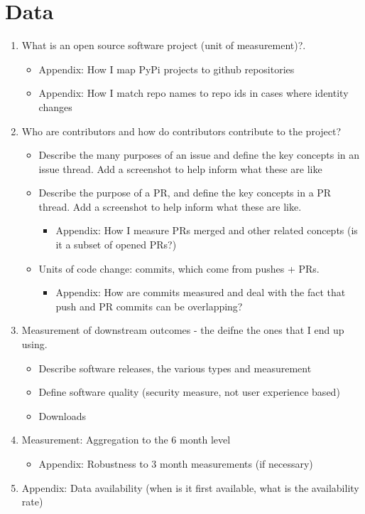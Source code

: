 \documentclass[12pt,notitlepage]{article}
\begin{document}
\section{Data} \label{sec:data}
\begin{enumerate}
    \item What is an open source software project (unit of measurement)?.
    \begin{itemize}
        \item Appendix: How I map PyPi projects to github repositories
        \item Appendix: How I match repo names to repo ids in cases where identity changes
    \end{itemize}
    \item Who are contributors and how do contributors contribute to the project?
    
    \begin{itemize}
        \item Describe the many purposes of an issue and define the key concepts in an issue thread. Add a screenshot to help inform what these are like
        \item Describe the purpose of a PR, and define the key concepts in a PR thread. Add a screenshot to help inform what these are like. 
        \begin{itemize}
            \item Appendix: How I measure PRs merged and other related concepts (is it a subset of opened PRs?)
        \end{itemize}
        \item Units of code change: commits, which come from pushes + PRs. 
        \begin{itemize}
            \item Appendix: How are commits measured and deal with the fact that push and PR commits can be overlapping? 
        \end{itemize}
    \end{itemize}
    \item Measurement of downstream outcomes - the deifne the ones that I end up using. 
    \begin{itemize}
        \item Describe software releases, the various types and measurement
        \item Define software quality (security measure, not user experience based)
        \item Downloads
    \end{itemize}
    \item Measurement: Aggregation to the 6 month level
    \begin{itemize}
        \item Appendix: Robustness to 3 month measurements (if necessary)
    \end{itemize}
    \item Appendix: Data availability (when is it first available, what is the availability rate)

\end{enumerate}
\end{document}
